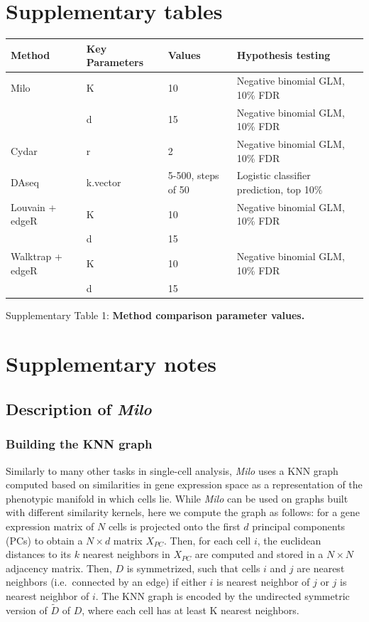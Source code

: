 \documentclass[
]{article}
\begin{document}
\newpage

\hypertarget{supplementary-tables}{%
\section{Supplementary tables}\label{supplementary-tables}}

\begin{longtable}[]{@{}llll@{}}
\toprule
Method & Key Parameters & Values & Hypothesis testing\tabularnewline
\midrule
\endhead
Milo & K & 10 & Negative binomial GLM, 10\% FDR\tabularnewline
& d & 15 & Negative binomial GLM, 10\% FDR\tabularnewline
Cydar & r & 2 & Negative binomial GLM, 10\% FDR\tabularnewline
DAseq & k.vector & 5-500, steps of 50 & Logistic classifier prediction, top 10\%\tabularnewline
Louvain + edgeR & K & 10 & Negative binomial GLM, 10\% FDR\tabularnewline
& d & 15 &\tabularnewline
Walktrap + edgeR & K & 10 & Negative binomial GLM, 10\% FDR\tabularnewline
& d & 15 &\tabularnewline
\bottomrule
\end{longtable}

Supplementary Table 1: \textbf{Method comparison parameter values.}

\newpage

\hypertarget{supplementary-notes}{%
\section{Supplementary notes}\label{supplementary-notes}}

\hypertarget{description-of-milo}{%
\subsection{\texorpdfstring{Description of \emph{Milo}}{Description of Milo}}\label{description-of-milo}}

\hypertarget{building-the-knn-graph}{%
\subsubsection{Building the KNN graph}\label{building-the-knn-graph}}

Similarly to many other tasks in single-cell analysis, \emph{Milo} uses a KNN graph computed based on similarities in gene expression space as a representation of the phenotypic manifold in which cells lie. While \emph{Milo} can be used on graphs built with different similarity kernels, here we compute the graph as follows: for a gene expression matrix of \(N\) cells is projected onto the first \(d\) principal components (PCs) to obtain a \(N \times d\) matrix \(X_{PC}\). Then, for each cell \(i\), the euclidean distances to its \(k\) nearest neighbors in \(X_{PC}\) are computed and stored in a \(N \times N\) adjacency matrix. Then, \(D\) is symmetrized, such that cells \(i\) and \(j\) are nearest neighbors (i.e.~connected by an edge) if either \(i\) is nearest neighbor of \(j\) or \(j\) is nearest neighbor of \(i\). The KNN graph is encoded by the undirected symmetric version of \(\tilde{D}\) of \(D\), where each cell has at least K nearest neighbors.
\end{document}
